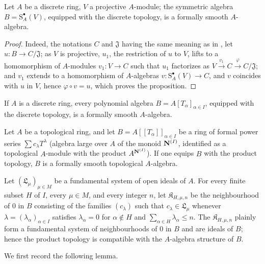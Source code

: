 \begin{proposition}[19.3.2]
\label{0.19.3.2}
Let $A$ be a discrete ring, $V$ a projective $A$-module;
the symmetric algebra $B=\mathrm{S}_A^\bullet(V)$, equipped with the discrete topology, is a formally smooth $A$-algebra.
\end{proposition}

\begin{proof}
Indeed, the notations $C$ and $\mathfrak{J}$ having the same meaning as in , let $u:B\to C/\mathfrak{J}$;
as $V$ is projective, $u_1$, the restriction of $u$ to $V$, lifts to a homomorphism of $A$-modules $v_1:V\to C$ such that $u_1$ factorizes as $V\xrightarrow{v_1}C\xrightarrow{\varphi}C/\mathfrak{J}$;
and $v_1$ extends to a homomorphism of $A$-algebras $v:\mathrm{S}_A^\bullet(V)\to C$, and $v$ coincides with $u$ in $V$, hence $\varphi\circ v=u$, which proves the proposition.
\end{proof}

\begin{corollary}[19.3.3]
\label{0.19.3.3}
If $A$ is a discrete ring, every polynomial algebra $B=A[T_\alpha]_{\alpha\in I}$, equipped with the discrete topology, is a formally smooth $A$-algebra.
\end{corollary}

\begin{proposition}[19.3.4]
\label{0.19.3.4}
Let $A$ be a topological ring, and let $B=A[[T_\alpha]]_{\alpha\in I}$ be a ring of formal power series $\sum c_\lambda T^\lambda$ (algebra large over $A$ of the monoid $\mathbf{N}^{(I)}$, identified as a topological $A$-module with the product $A^{\mathbf{N}^{(I)}}$).
If one equips $B$ with the product topology, $B$ is a formally smooth topological $A$-algebra.
\end{proposition}

Let $(\mathfrak{L}_\mu)_{\mu\in M}$ be a fundamental system of open ideals of $A$.
For every finite subset $H$ of $I$, every $\mu\in M$, and every integer $n$, let $\mathfrak{K}_{H,\mu,n}$ be the neighbourhood of $0$ in $B$ consisting of the families $(c_\lambda)$ such that $c_\lambda\in\mathfrak{L}_\mu$ whenever $\lambda=(\lambda_\alpha)_{\alpha\in I}$ satisfies $\lambda_\alpha=0$ for $\alpha\notin H$ and $\sum_{\alpha\in H}\lambda_\alpha\leq n$.
The $\mathfrak{K}_{H,\mu,n}$ plainly form a fundamental system of neighbourhoods of $0$ in $B$ and are ideals of $B$; hence the product topology is compatible with the $A$-algebra structure of $B$.

We first record the following lemma.

